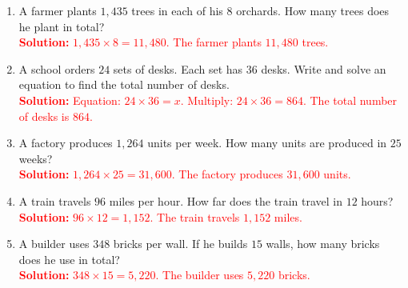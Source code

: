 \documentclass[12pt]{article}
\begin{document}
\begin{tcolorbox}[colframe=black!60, colback=white, 
coltitle=black, colbacktitle=black!15, fonttitle=\bfseries\Large, 
title=Problems, halign title=center, left=10pt, right=10pt, top=10pt, bottom=90pt]
\begin{enumerate}[start=9, itemsep=4em]
    \item A farmer plants \( 1,435 \) trees in each of his \( 8 \) orchards. How many trees does he plant in total?\\
    \textcolor{red}{\textbf{Solution:} \(1,435 \times 8 = 11,480\). The farmer plants \(11,480\) trees.}
    
    \item A school orders \( 24 \) sets of desks. Each set has \( 36 \) desks. Write and solve an equation to find the total number of desks.\\
    \textcolor{red}{\textbf{Solution:} Equation: \(24 \times 36 = x\). Multiply: \(24 \times 36 = 864\). The total number of desks is \(864\).}
    
    \item A factory produces \( 1,264 \) units per week. How many units are produced in \( 25 \) weeks?\\
    \textcolor{red}{\textbf{Solution:} \(1,264 \times 25 = 31,600\). The factory produces \(31,600\) units.}
    
    \item A train travels \( 96 \) miles per hour. How far does the train travel in \( 12 \) hours?\\
    \textcolor{red}{\textbf{Solution:} \(96 \times 12 = 1,152\). The train travels \(1,152\) miles.}
    
    \item A builder uses \( 348 \) bricks per wall. If he builds \( 15 \) walls, how many bricks does he use in total?\\
    \textcolor{red}{\textbf{Solution:} \(348 \times 15 = 5,220\). The builder uses \(5,220\) bricks.}
\end{enumerate}
\end{tcolorbox}

\vspace{1em}
\end{document}
